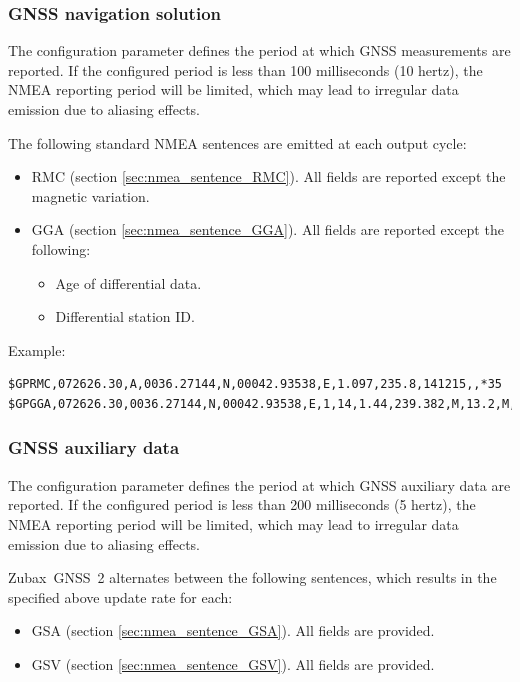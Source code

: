 \documentclass{zubaxdoc}
\begin{document}
\subsubsection{GNSS navigation solution}

The configuration parameter  defines the period at which GNSS measurements are reported.
If the configured period is less than 100 milliseconds (10 hertz),
the NMEA reporting period will be limited,
which may lead to irregular data emission due to aliasing effects.

The following standard NMEA sentences are emitted at each output cycle:
\begin{itemize}
    \item RMC (section \ref{sec:nmea_sentence_RMC}). All fields are reported except the magnetic variation.
    \item GGA (section \ref{sec:nmea_sentence_GGA}). All fields are reported except the following:
    \begin{itemize}
        \item Age of differential data.
        \item Differential station ID.
    \end{itemize}
\end{itemize}

Example:
\begin{verbatim}
$GPRMC,072626.30,A,0036.27144,N,00042.93538,E,1.097,235.8,141215,,*35
$GPGGA,072626.30,0036.27144,N,00042.93538,E,1,14,1.44,239.382,M,13.2,M,,*5E
\end{verbatim}

\subsubsection{GNSS auxiliary data}

The configuration parameter  defines the period at which GNSS auxiliary data are reported.
If the configured period is less than 200 milliseconds (5 hertz),
the NMEA reporting period will be limited,
which may lead to irregular data emission due to aliasing effects.

Zubax~GNSS~2 alternates between the following sentences,
which results in the specified above update rate for each:
\begin{itemize}
    \item GSA (section \ref{sec:nmea_sentence_GSA}). All fields are provided.
    \item GSV (section \ref{sec:nmea_sentence_GSV}). All fields are provided.
\end{itemize}
\end{document}
